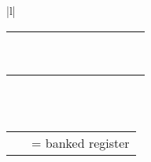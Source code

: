 \begin{tabular}{|l|}
\begin{tabular}[b]{|l|c|l|c|l|c|l|c|l|c|l|}
	\hhline{-*{5}{~-}}
	\register{R11} & & \cellcolor{gray!25}\register{R11\_fiq} & & \register{R11} & & \register{R11} & & \register{R11} & & \register{R11}\\
	\hhline{-*{5}{~-}}
	\register{R12} & & \cellcolor{gray!25}\register{R12\_fiq} & & \register{R12} & & \register{R12} & & \register{R12} & & \register{R12}\\
	\hhline{-*{5}{~-}}
	\register{R13} & & \cellcolor{gray!25}\register{R13\_fiq} & & \cellcolor{gray!25}\register{R13\_svc} & & \cellcolor{gray!25}\register{R13\_abt} & & \cellcolor{gray!25}\register{R13\_irq} & & \cellcolor{gray!25}\register{R13\_und} \\
	\hhline{-*{5}{~-}}
	\register{R14} & & \cellcolor{gray!25}\register{R14\_fiq} & & \cellcolor{gray!25}\register{R14\_svc} & & \cellcolor{gray!25}\register{R14\_abt} & & \cellcolor{gray!25}\register{R14\_irq} & & \cellcolor{gray!25}\register{R14\_und} \\
	\hhline{-*{5}{~-}}
	\register{R15 (PC)} & & \register{R15 (PC)} & & \register{R15 (PC)} & & \register{R15 (PC)} & & \register{R15 (PC)} & & \register{R15 (PC)} \\
	\hhline{-*{5}{~-}}
	\multicolumn{1}{c}{} \\
	\hhline{-*{5}{~-}}
	\register{CPSR} & & \register{CPSR} & & \register{CPSR} & & \register{CPSR} & & \register{CPSR} & & \register{CPSR} \\
	\hhline{-*{5}{~-}}
	\multicolumn{1}{c}{} & & \cellcolor{gray!25}\register{SPSR\_fiq} & & \cellcolor{gray!25}\register{SPSR\_svc} & & \cellcolor{gray!25}\register{SPSR\_abt} & & \cellcolor{gray!25}\register{SPSR\_irq} & & \cellcolor{gray!25}\register{SPSR\_und} \\
	\hhline{~*{5}{~-}}
\end{tabular}\\
\\
\ttfamily
\small
\begin{tabular}{ll}\cellcolor{gray!25} \ & = banked register \\ \end{tabular} \\
\\
\hline
\end{tabular}
